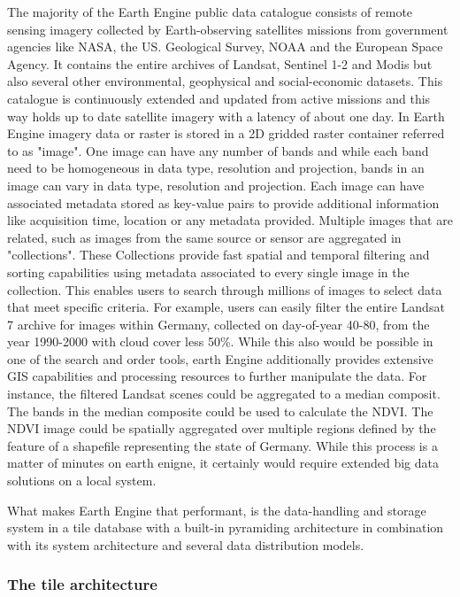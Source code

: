 \documentclass[11pt,twoside,a4paper,final]{report}
\begin{document}
The majority of the Earth Engine public data catalogue consists of remote sensing imagery collected by Earth-observing satellites missions from government agencies like NASA, the US. Geological Survey, NOAA and the European Space Agency. It contains the entire archives of Landsat, Sentinel 1-2 and Modis but also several other environmental, geophysical and social-economic datasets. This catalogue is continuously extended and updated from active missions and this way holds up to date satellite imagery with a latency of about one day.
In Earth Engine imagery data or raster is stored in a 2D gridded raster container referred to as "image". One image can have any number of bands and while each band need to be homogeneous in data type, resolution and projection, bands in an image can vary in data type, resolution and projection. Each image can have associated metadata stored as key-value pairs to provide additional information like acquisition time, location or any metadata provided.
Multiple images that are related, such as images from the same source or sensor are aggregated in "collections". These Collections provide fast spatial and temporal filtering and sorting capabilities using metadata associated to every single image in the collection. This enables users to search through millions of images to select data that meet specific criteria. For example, users can easily filter the entire Landsat 7 archive for images within Germany, collected on day-of-year 40-80, from the year 1990-2000 with cloud cover less 50\%. While this also would be possible in one of the search and order tools, earth Engine additionally provides extensive GIS capabilities and processing resources to further manipulate the data.
For instance, the filtered Landsat scenes could be aggregated to a median composit. The bands in the median composite could be used to calculate the NDVI. The NDVI image could be spatially aggregated over multiple regions defined by the feature of a shapefile representing the state of Germany. While this process is a matter of minutes on earth enigne, it certainly would require extended big data solutions on a local system.

What makes Earth Engine that performant, is the data-handling and storage system in a tile database with a built-in pyramiding architecture in combination with its system architecture and several data distribution models.

\subsubsection{The tile architecture}
\end{document}
